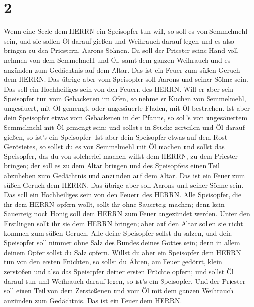 \hypertarget{section-1}{%
\section{2}\label{section-1}}

 Wenn eine Seele dem HERRN ein Speisopfer tun will, so soll
es von Semmelmehl sein, und sie sollen Öl darauf gießen und Weihrauch
darauf legen  und es also bringen zu den Priestern, Aarons
Söhnen. Da soll der Priester seine Hand voll nehmen von dem Semmelmehl
und Öl, samt dem ganzen Weihrauch und es anzünden zum Gedächtnis auf dem
Altar. Das ist ein Feuer zum süßen Geruch dem HERRN.  Das
übrige aber vom Speisopfer soll Aarons und seiner Söhne sein. Das soll
ein Hochheiliges sein von den Feuern des HERRN.  Will er
aber sein Speisopfer tun vom Gebackenen im Ofen, so nehme er Kuchen von
Semmelmehl, ungesäuert, mit Öl gemengt, oder ungesäuerte Fladen, mit Öl
bestrichen.  Ist aber dein Speisopfer etwas vom Gebackenen
in der Pfanne, so soll's von ungesäuertem Semmelmehl mit Öl gemengt
sein;  und sollst's in Stücke zerteilen und Öl darauf
gießen, so ist's ein Speisopfer.  Ist aber dein Speisopfer
etwas auf dem Rost Geröstetes, so sollst du es von Semmelmehl mit Öl
machen  und sollst das Speisopfer, das du von solcherlei
machen willst dem HERRN, zu dem Priester bringen; der soll es zu dem
Altar bringen  und des Speisopfers einen Teil abzuheben zum
Gedächtnis und anzünden auf dem Altar. Das ist ein Feuer zum süßen
Geruch dem HERRN.  Das übrige aber soll Aarons und seiner
Söhne sein. Das soll ein Hochheiliges sein von den Feuern des HERRN.
 Alle Speisopfer, die ihr dem HERRN opfern wollt, sollt ihr
ohne Sauerteig machen; denn kein Sauerteig noch Honig soll dem HERRN zum
Feuer angezündet werden.  Unter den Erstlingen sollt ihr
sie dem HERRN bringen; aber auf den Altar sollen sie nicht kommen zum
süßen Geruch.  Alle deine Speisopfer sollst du salzen, und
dein Speisopfer soll nimmer ohne Salz des Bundes deines Gottes sein;
denn in allem deinem Opfer sollst du Salz opfern.  Willst
du aber ein Speisopfer dem HERRN tun von den ersten Früchten, so sollst
du Ähren, am Feuer gedörrt, klein zerstoßen und also das Speisopfer
deiner ersten Früchte opfern;  und sollst Öl darauf tun und
Weihrauch darauf legen, so ist's ein Speisopfer.  Und der
Priester soll einen Teil von dem Zerstoßenen und vom Öl mit dem ganzen
Weihrauch anzünden zum Gedächtnis. Das ist ein Feuer dem HERRN.

